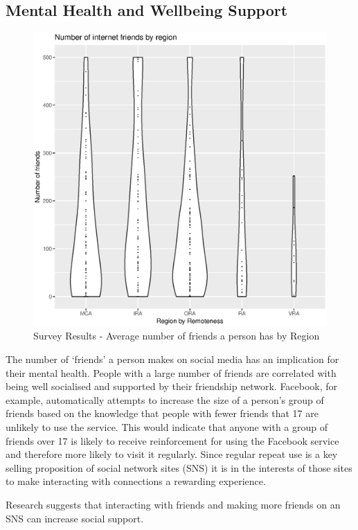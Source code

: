 \subsection{Mental Health and Wellbeing Support}
\begin{figure}
\centering
\includegraphics[scale=0.5]{figures/VChart16-NumberFriendsRegion.eps}
\caption{Survey Results - Average number of friends a person has by Region} \label{fig:VC016NumFriendsRegions}
\end{figure}
The number of `friends' a person makes on social media has an implication for their mental health. People with a large number of friends are correlated with being well socialised and supported by their friendship network. Facebook, for example, automatically attempts to increase the size of a person's group of friends based on the knowledge that people with fewer friends that 17 are unlikely to use the service. This would indicate that anyone with a group of friends over 17 is likely to receive reinforcement for using the Facebook service and therefore more likely to visit it regularly. Since regular repeat use is a key selling proposition of social network sites (SNS) it is in the interests of those sites to make interacting with connections a rewarding experience.

Research suggests that interacting with friends and making more friends on an SNS can increase social support. 

